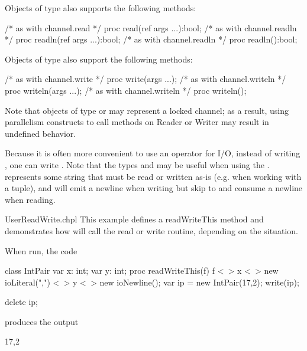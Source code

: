 Objects of type  also supports the following methods:
\begin{chapel}
  /* as with channel.read */
  proc read(ref args ...):bool;
  /* as with channel.readln */
  proc readln(ref args ...):bool;
  /* as with channel.readln */
  proc readln():bool;
\end{chapel}
Objects of type  also support the following methods:
\begin{chapel}
  /* as with channel.write */
  proc write(args ...);
  /* as with channel.writeln */
  proc writeln(args ...);
  /* as with channel.writeln */
  proc writeln();
\end{chapel}

Note that objects of type  or  may represent a locked channel; as a result, using parallelism constructs to call methods on Reader or Writer may result in undefined behavior.

Because it is often more convenient to use an operator for I/O, instead of writing , one can write . Note that the types  and  may be useful when using the \chpl{<~>}.  represents some string that must be read or written as-is (e.g.  when working with a tuple), and  will emit a newline when writing but skip to and consume a newline when reading.

\begin{chapelexample}{UserReadWrite.chpl}
This example defines a readWriteThis method and demonstrates how \chpl{<~>} will
call the read or write routine, depending on the situation.

When run, the code
\begin{chapel}
class IntPair {
  var x: int;
  var y: int;
  proc readWriteThis(f) {
    f <~> x <~> new ioLiteral(",") <~> y <~> new ioNewline();
  }
}
var ip = new IntPair(17,2);
write(ip);
\end{chapel}
\begin{chapelpost}
delete ip;
\end{chapelpost}
produces the output
\begin{chapelprintoutput}{}
17,2
\end{chapelprintoutput}
\end{chapelexample}

